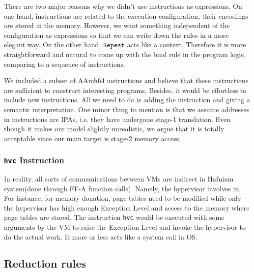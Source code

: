 \documentclass[a4paper]{article}
\newcommand*{\instr}[1]{\texttt{#1}}
\begin{document}
There are two major reasons why we didn't use instructions as expressions. On
one hand,
instructions are related to the execution configuration, their encodings are
stored in the memory. However, we want something independent of the
configuration as expressions so that we can write down the rules in a more
elegant way. On the other hand, $\mathtt{Repeat}$ acts like a context.
Therefore it is more straightforward and natural to come up with the bind rule
in the program logic, comparing to a sequence of instructions.


We included a subset of AArch64 instructions and believe that these instructions
are sufficient to construct interesting programs. Besides, it would be
effortless to include new instructions. All we need to do is adding the
instruction and giving a semantic interpretation. One minor thing to mention is
that we assume addresses in instructions are IPAs, i.e. they have undergone
stage-1 translation. Even though it makes our model slightly unrealistic, we argue
that it is totally acceptable since our main target is stage-2 memory access.

\subsubsection{\instr{hvc} Instruction}
In reality, all sorts of communications
between VMs are indirect in Hafnium system(done through FF-A function calls).
Namely, the hypervisor involves in. For instance, for memory donation, page
tables need to be modified while only the hypervisor has high enough Exception
Level and access to the memory where page tables are stored. The instruction
\texttt{hvc} would be executed with some arguments by the VM to raise the
Exception Level and invoke the hypervisor to do the actual work. It more or less
acts like a system call in OS.




\subsection{Reduction rules}
\end{document}

